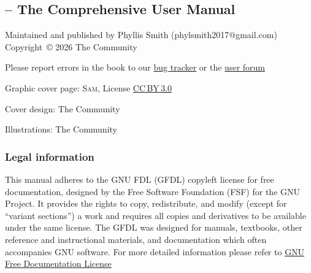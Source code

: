 %
\begingroup %
\setlength{\parskip}{0.4\baselineskip}
\subsection*{\sffamily\CGG{} -- The Comprehensive User Manual}
\label{sec:Impressum}
%
%
Maintained and published by Phyllis Smith (phylsmith2017@gmail.com)\\[+1.2em]
Copyright~\copyright{} 2026 The \CGG{} Community\par
Please report errors in the book to our \href{https://bug.cinelerra-gg.org}{bug tracker} 
or the \href{https://www.cinelerra-gg.org/forum/}{user forum}\par
Graphic cover page: \textsc{Sam}, License
\textsc{\href{https://creativecommons.org/licenses/by/3.0/}{CC\,BY\,3.0}}\par
Cover design: The \CGG{} Community\par
Illustrations: The \CGG{} Community%
\bigskip%

\footnotesize
\subsubsection*{\sffamily{}Legal information}
\label{sec:Legal-information}
This manual adheres to the GNU FDL (GFDL) copyleft license for free documentation,
designed by the Free Software Foundation (FSF) for the GNU Project. It provides the
rights to copy, redistribute, and modify (except for ``variant sections'') a work
and requires all copies and derivatives to be available under the same license.
The GFDL was designed for manuals, textbooks, other reference and instructional
materials, and documentation which often accompanies GNU software. For more
detailed information please refer to
\href{https://www.gnu.org/licenses/fdl-1.3.en.html}{GNU Free Documentation License}

